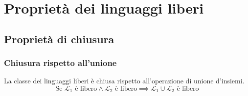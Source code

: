 \documentclass[class=book, crop=false, oneside, 12pt]{standalone}
\begin{document}
\chapter{Proprietà dei linguaggi liberi}  

\section{Proprietà di chiusura}
\subsection*{Chiusura rispetto all'unione}
\begin{lemma}
  La classe dei linguaggi liberi è chiusa rispetto all'operazione di unione d'insiemi.
  \begin{equation*}
    \textrm{Se } \mathcal{L}_1 \textrm{ è libero} \land \mathcal{L}_2 \textrm{ è libero} \implies \mathcal{L}_1 \cup \mathcal{L}_2 \textrm{ è libero}
  \end{equation*}
\end{lemma}
\end{document}

